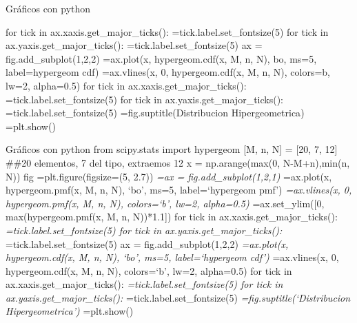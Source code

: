 \documentclass[
  ignorenonframetext,
  aspectratio=169]{beamer}
\newenvironment{Shaded}{\begin{snugshade}}{\end{snugshade}}
\newcommand{\ControlFlowTok}[1]{\textcolor[rgb]{0.00,0.23,0.31}{#1}}
\newcommand{\DecValTok}[1]{\textcolor[rgb]{0.68,0.00,0.00}{#1}}
\newcommand{\FloatTok}[1]{\textcolor[rgb]{0.68,0.00,0.00}{#1}}
\newcommand{\KeywordTok}[1]{\textcolor[rgb]{0.00,0.23,0.31}{#1}}
\newcommand{\NormalTok}[1]{\textcolor[rgb]{0.00,0.23,0.31}{#1}}
\newcommand{\OperatorTok}[1]{\textcolor[rgb]{0.37,0.37,0.37}{#1}}
\newcommand{\StringTok}[1]{\textcolor[rgb]{0.13,0.47,0.30}{#1}}
\begin{document}
\begin{frame}[fragile]{Gráficos con python}
\protect\hypertarget{gruxe1ficos-con-python-6}{}
\begin{Shaded}
\begin{Highlighting}[]
\ControlFlowTok{for}\NormalTok{ tick }\KeywordTok{in}\NormalTok{ ax.xaxis.get\_major\_ticks():}
   \OperatorTok{=}\NormalTok{tick.label.set\_fontsize(}\DecValTok{5}\NormalTok{)}
\ControlFlowTok{for}\NormalTok{ tick }\KeywordTok{in}\NormalTok{ ax.yaxis.get\_major\_ticks():}
  \OperatorTok{=}\NormalTok{tick.label.set\_fontsize(}\DecValTok{5}\NormalTok{) }
\NormalTok{ax }\OperatorTok{=}\NormalTok{ fig.add\_subplot(}\DecValTok{1}\NormalTok{,}\DecValTok{2}\NormalTok{,}\DecValTok{2}\NormalTok{)}
 \OperatorTok{=}\NormalTok{ax.plot(x, hypergeom.cdf(x, M, n, N), }\StringTok{\textquotesingle{}bo\textquotesingle{}}\NormalTok{, ms}\OperatorTok{=}\DecValTok{5}\NormalTok{, label}\OperatorTok{=}\StringTok{\textquotesingle{}hypergeom cdf\textquotesingle{}}\NormalTok{)}
 \OperatorTok{=}\NormalTok{ax.vlines(x, }\DecValTok{0}\NormalTok{, hypergeom.cdf(x, M, n, N), colors}\OperatorTok{=}\StringTok{\textquotesingle{}b\textquotesingle{}}\NormalTok{, lw}\OperatorTok{=}\DecValTok{2}\NormalTok{, alpha}\OperatorTok{=}\FloatTok{0.5}\NormalTok{)}
\ControlFlowTok{for}\NormalTok{ tick }\KeywordTok{in}\NormalTok{ ax.xaxis.get\_major\_ticks():}
   \OperatorTok{=}\NormalTok{tick.label.set\_fontsize(}\DecValTok{5}\NormalTok{)}
\ControlFlowTok{for}\NormalTok{ tick }\KeywordTok{in}\NormalTok{ ax.yaxis.get\_major\_ticks():}
   \OperatorTok{=}\NormalTok{tick.label.set\_fontsize(}\DecValTok{5}\NormalTok{)}
 \OperatorTok{=}\NormalTok{fig.suptitle(}\StringTok{\textquotesingle{}Distribucion Hipergeometrica\textquotesingle{}}\NormalTok{)}
 \OperatorTok{=}\NormalTok{plt.show()}
\end{Highlighting}
\end{Shaded}
\end{frame}

\begin{frame}{Gráficos con python}
\protect\hypertarget{gruxe1ficos-con-python-7}{}
from scipy.stats import hypergeom {[}M, n, N{]} = {[}20, 7, 12{]} \#\#20
elementos, 7 del tipo, extraemos 12 x = np.arange(max(0, N-M+n),min(n,
N)) fig =plt.figure(figsize=(5, 2.7)) \emph{=ax =
fig.add\_subplot(1,2,1) }=ax.plot(x, hypergeom.pmf(x, M, n, N), `bo',
ms=5, label=`hypergeom pmf') \emph{=ax.vlines(x, 0, hypergeom.pmf(x, M,
n, N), colors=`b', lw=2, alpha=0.5) }=ax.set\_ylim({[}0,
max(hypergeom.pmf(x, M, n, N))*1.1{]}) for tick in
ax.xaxis.get\_major\_ticks(): \emph{=tick.label.set\_fontsize(5) for
tick in ax.yaxis.get\_major\_ticks(): }=tick.label.set\_fontsize(5) ax =
fig.add\_subplot(1,2,2) \emph{=ax.plot(x, hypergeom.cdf(x, M, n, N),
`bo', ms=5, label=`hypergeom cdf') }=ax.vlines(x, 0, hypergeom.cdf(x, M,
n, N), colors=`b', lw=2, alpha=0.5) for tick in
ax.xaxis.get\_major\_ticks(): \emph{=tick.label.set\_fontsize(5) for
tick in ax.yaxis.get\_major\_ticks(): }=tick.label.set\_fontsize(5)
\emph{=fig.suptitle(`Distribucion Hipergeometrica') }=plt.show()
\end{frame}
\end{document}
